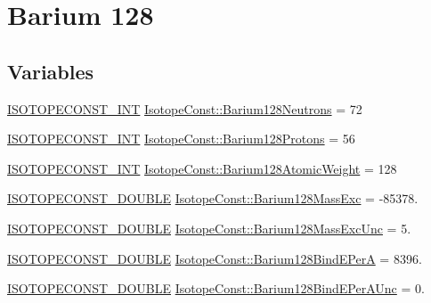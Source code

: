 \hypertarget{group___isotope_const-_barium-_ba128}{}\section{Barium 128}
\label{group___isotope_const-_barium-_ba128}
\subsection*{Variables}
\begin{DoxyCompactItemize}
\item 
\mbox{\hyperlink{group___isotope_const-_macros_ga5f18360b3e99483a35c32d789e62621c}{I\+S\+O\+T\+O\+P\+E\+C\+O\+N\+S\+T\+\_\+\+I\+NT}} \mbox{\hyperlink{group___isotope_const-_barium-_ba128_ga19a2a60844e125ee83fcd96a125e3035}{Isotope\+Const\+::\+Barium128\+Neutrons}} = 72
\item 
\mbox{\hyperlink{group___isotope_const-_macros_ga5f18360b3e99483a35c32d789e62621c}{I\+S\+O\+T\+O\+P\+E\+C\+O\+N\+S\+T\+\_\+\+I\+NT}} \mbox{\hyperlink{group___isotope_const-_barium-_ba128_ga4e94c1ecc65140270eed8793090d044d}{Isotope\+Const\+::\+Barium128\+Protons}} = 56
\item 
\mbox{\hyperlink{group___isotope_const-_macros_ga5f18360b3e99483a35c32d789e62621c}{I\+S\+O\+T\+O\+P\+E\+C\+O\+N\+S\+T\+\_\+\+I\+NT}} \mbox{\hyperlink{group___isotope_const-_barium-_ba128_gae72c588166fcca3703092a8509e4f5cd}{Isotope\+Const\+::\+Barium128\+Atomic\+Weight}} = 128
\item 
\mbox{\hyperlink{group___isotope_const-_macros_ga8f45a7272ce02c0b4c65c44636ed719a}{I\+S\+O\+T\+O\+P\+E\+C\+O\+N\+S\+T\+\_\+\+D\+O\+U\+B\+LE}} \mbox{\hyperlink{group___isotope_const-_barium-_ba128_gaca66708512189c3db82108bff2cc84d9}{Isotope\+Const\+::\+Barium128\+Mass\+Exc}} = -\/85378.
\item 
\mbox{\hyperlink{group___isotope_const-_macros_ga8f45a7272ce02c0b4c65c44636ed719a}{I\+S\+O\+T\+O\+P\+E\+C\+O\+N\+S\+T\+\_\+\+D\+O\+U\+B\+LE}} \mbox{\hyperlink{group___isotope_const-_barium-_ba128_gae2baa15dbe894d83f6721e9718d59e2a}{Isotope\+Const\+::\+Barium128\+Mass\+Exc\+Unc}} = 5.
\item 
\mbox{\hyperlink{group___isotope_const-_macros_ga8f45a7272ce02c0b4c65c44636ed719a}{I\+S\+O\+T\+O\+P\+E\+C\+O\+N\+S\+T\+\_\+\+D\+O\+U\+B\+LE}} \mbox{\hyperlink{group___isotope_const-_barium-_ba128_gace432bbbd5ab5f9e66ebb42bd20f2a5f}{Isotope\+Const\+::\+Barium128\+Bind\+E\+PerA}} = 8396.
\item 
\mbox{\hyperlink{group___isotope_const-_macros_ga8f45a7272ce02c0b4c65c44636ed719a}{I\+S\+O\+T\+O\+P\+E\+C\+O\+N\+S\+T\+\_\+\+D\+O\+U\+B\+LE}} \mbox{\hyperlink{group___isotope_const-_barium-_ba128_gad02fdcb1659f5b532cb2956ea6c904ac}{Isotope\+Const\+::\+Barium128\+Bind\+E\+Per\+A\+Unc}} = 0.

\end{DoxyCompactItemize}
